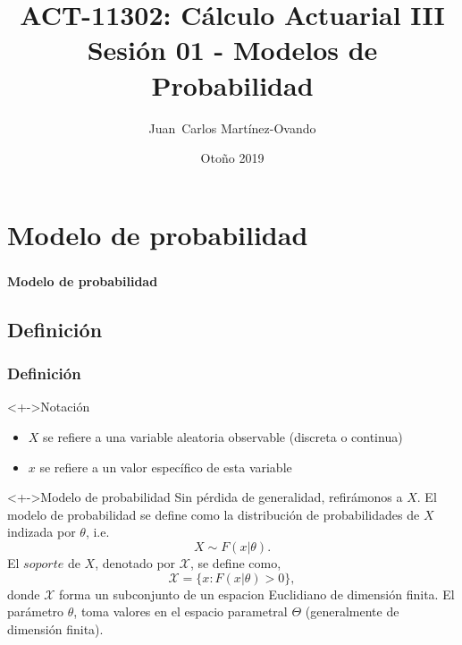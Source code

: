 \documentclass[cjk,t,compress]{beamer}
\title[C\'alculo Actuarial III]
{	ACT-11302: C\'alculo Actuarial III\\
	{\large Sesi\'on 01 - Modelos de Probabilidad}
}
\author[Mart\'inez-Ovando]{
{	\footnotesize
	\textcolor{MyDarkGreen}{Juan~Carlos Mart\'inez-Ovando}}
}
\institute[ITAM]
{	\textcolor{MyDarkGrey}{
	ITAM}
}
\date[ ] %
{	\scriptsize
	\textcolor{MyDarkGrey}{Oto\~no 2019}
}
\begin{document}
\sffamily
\frame
	{
   \frametitle{}
	\titlepage
	}
	


\section{Modelo de probabilidad}
	\frame
	{
   \frametitle{}
		
		\vspace{5.5cm}
		\begin{flushright}
			\textcolor{MyDarkBlue}{\Large \bf Modelo de probabilidad}
		\end{flushright}
	}
	
	\subsection{Definici\'on}
	\frame
	{
    \frametitle{Definici\'on}
  		{\scriptsize  	
		
		\begin{block}<+->{Notaci\'on}
	  	{
	  	\begin{itemize}
	  		\item $X$ se refiere a una variable aleatoria observable (discreta o continua) 
	  		\item $x$ se refiere a un valor espec\'ifico de esta variable
	  	\end{itemize}
	  	}
 		\end{block}  		

	  	\vspace{0.3cm}
		\begin{block}<+->{Modelo de probabilidad}
	  	{
		Sin p\'erdida de generalidad, refir\'amonos a $X$. El modelo de probabilidad se define como la distribuci\'on de probabilidades de $X$ indizada por $\theta$, i.e.
		\begin{equation}
			X \sim F(x|\theta).
		\end{equation}
	  	\vspace{0.1cm}
	  	El $soporte$ de $X$, denotado por $\mathcal{X}$, se define como,	  	
		\begin{equation}
			\mathcal{X}=\{x:F(x|\theta)>0\},
		\end{equation}
		donde $\mathcal{X}$ forma un subconjunto de un espacion Euclidiano de dimensi\'on finita.
	  	\vspace{0.1cm}
	  	El par\'ametro $\theta$, toma valores en el espacio parametral $\Theta$ (generalmente de dimensi\'on finita).
		}
 		\end{block}  		

		}
	}
\end{document}
